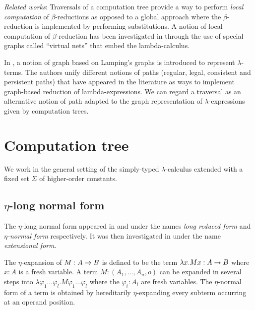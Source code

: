 \emph{Related works}: Traversals of a computation tree provide a way
to perform \emph{local computation} of $\beta$-reductions as opposed
to a global approach where the $\beta$-reduction is implemented by
performing substitutions. A notion of local computation of
$\beta$-reduction has been investigated in
\cite{DanosRegnier-Localandasynchronou} through the use of special
graphs called ``virtual nets'' that embed the lambda-calculus.

In \cite{DBLP:conf/lics/AspertiDLR94}, a notion of graph based on
Lamping's graphs \citep{lamping} is introduced to represent
$\lambda$-terms. The authors unify different notions of paths
(regular, legal, consistent and persistent paths) that have appeared
in the literature as ways to implement graph-based reduction of
lambda-expressions. We can regard a traversal as an alternative
notion of path adapted to the graph representation of
$\lambda$-expressions given by computation trees.



%

\section{Computation tree}
We work in the general setting of the simply-typed
$\lambda$-calculus extended with a fixed set $\Sigma$ of
higher-order constants.

\subsection{$\eta$-long normal form}

The $\eta$-long normal form appeared in
\citep{DBLP:journals/tcs/JensenP76} and
\citep{DBLP:journals/tcs/Huet75} under the names \emph{long reduced
form} and \emph{$\eta$-normal form} respectively. It was then
investigated in \citep{huet76} under the name \emph{extensional
form}.

The $\eta$-expansion of $M: A\rightarrow B$ is defined to be the term
$\lambda x . M x : A\rightarrow B$ where $x:A$ is a fresh variable. A
term $M : (A_1,\ldots,A_n,o)$ can be expanded in several steps into
$\lambda \varphi_1 \ldots \varphi_l . M \varphi_1 \ldots \varphi_l$
where the $\varphi_i:A_i$ are fresh variables. The $\eta$-normal
form of a term is obtained by hereditarily $\eta$-expanding every
subterm occurring at an operand position.

